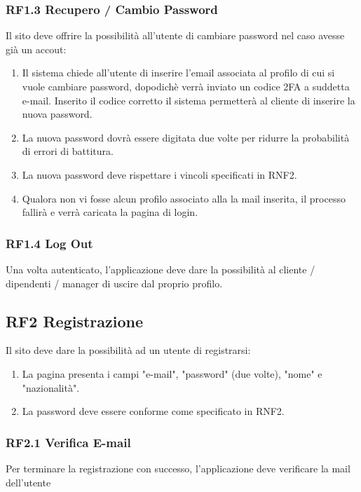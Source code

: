 \documentclass{report}
\begin{document}
	\subsubsection*{RF1.3 Recupero / Cambio Password}
	Il sito deve offrire la possibilità all'utente di cambiare password nel caso avesse già un accout:
	\begin{enumerate}
			
	\item Il sistema chiede all'utente di inserire l'email associata al profilo di cui si vuole cambiare password, dopodichè verrà inviato un codice 2FA a suddetta e-mail. Inserito il codice corretto il sistema permetterà al cliente di inserire la nuova password.

		\item La nuova password dovrà essere digitata due volte per ridurre la probabilità di errori di battitura.
		
		\item La nuova password deve rispettare i vincoli specificati in RNF2.
		
		\item Qualora non vi fosse alcun profilo associato alla la mail inserita, il processo fallirà e verrà caricata la pagina di login.
	\end{enumerate}
	
	\subsubsection{RF1.4 Log Out}
	
	Una volta autenticato, l'applicazione deve dare la possibilità al cliente / dipendenti / manager di uscire dal proprio profilo.

\subsection*{RF2 Registrazione}
Il sito deve dare la possibilità ad un utente di registrarsi:
\begin{enumerate}
	\item La pagina presenta i campi "e-mail", "password" (due volte), "nome" e "nazionalità". 
	\item La password deve essere conforme come specificato in RNF2.
\end{enumerate}

\subsubsection*{RF2.1 Verifica E-mail}
Per terminare la registrazione con successo, l'applicazione deve verificare la mail dell'utente
\end{document}
